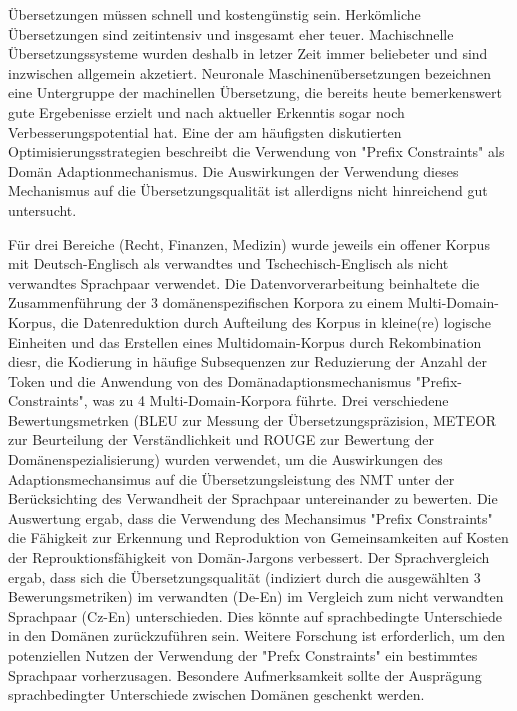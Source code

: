 Übersetzungen müssen schnell und kostengünstig sein.
Herkömliche Übersetzungen sind zeitintensiv und insgesamt eher teuer.
Machischnelle Übersetzungssysteme wurden deshalb in letzer Zeit immer beliebeter und sind inzwischen allgemein akzetiert.
Neuronale Maschinenübersetzungen bezeichnen eine Untergruppe der machinellen Übersetzung, die bereits heute bemerkenswert gute Ergebenisse erzielt und nach aktueller Erkenntis sogar noch Verbesserungspotential hat.
Eine der am häufigsten diskutierten Optimisierungsstrategien beschreibt die Verwendung von "Prefix Constraints" als Domän Adaptionmechanismus.
Die Auswirkungen der Verwendung dieses Mechanismus auf die Übersetzungsqualität ist allerdigns nicht hinreichend gut untersucht.

Für drei Bereiche (Recht, Finanzen, Medizin) wurde jeweils ein offener Korpus mit Deutsch-Englisch als verwandtes und Tschechisch-Englisch als nicht verwandtes Sprachpaar verwendet.
Die Datenvorverarbeitung beinhaltete die Zusammenführung der 3 domänenspezifischen Korpora zu einem Multi-Domain-Korpus, die Datenreduktion durch Aufteilung des Korpus in kleine(re) logische Einheiten und das Erstellen eines Multidomain-Korpus durch Rekombination diesr, die Kodierung in häufige Subsequenzen zur Reduzierung der Anzahl der Token und die Anwendung von des Domänadaptionsmechanismus "Prefix-Constraints", was zu 4 Multi-Domain-Korpora führte.
Drei verschiedene Bewertungsmetrken (BLEU zur Messung der Übersetzungspräzision, METEOR zur Beurteilung der Verständlichkeit und ROUGE zur Bewertung der Domänenspezialisierung) wurden verwendet, um die Auswirkungen des Adaptionsmechansimus auf die Übersetzungsleistung des NMT unter der Berücksichting des Verwandheit der Sprachpaar untereinander zu bewerten.
Die Auswertung ergab, dass die Verwendung des Mechansimus "Prefix Constraints" die Fähigkeit zur Erkennung und Reproduktion von Gemeinsamkeiten auf Kosten der Reprouktionsfähigkeit von Domän-Jargons verbessert.
Der Sprachvergleich ergab, dass sich die Übersetzungsqualität (indiziert durch die ausgewählten 3 Bewerungsmetriken) im verwandten (De-En) im Vergleich zum nicht verwandten Sprachpaar (Cz-En) unterschieden.
Dies könnte auf sprachbedingte Unterschiede in den Domänen zurückzuführen sein.
Weitere Forschung ist erforderlich, um den potenziellen Nutzen der Verwendung der "Prefx Constraints" ein bestimmtes Sprachpaar vorherzusagen.
Besondere Aufmerksamkeit sollte der Ausprägung sprachbedingter Unterschiede zwischen Domänen geschenkt werden.
